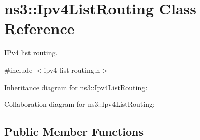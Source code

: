 \hypertarget{classns3_1_1Ipv4ListRouting}{}\section{ns3\+:\+:Ipv4\+List\+Routing Class Reference}
\label{classns3_1_1Ipv4ListRouting}


I\+Pv4 list routing.  




{\ttfamily \#include $<$ipv4-\/list-\/routing.\+h$>$}



Inheritance diagram for ns3\+:\+:Ipv4\+List\+Routing\+:


Collaboration diagram for ns3\+:\+:Ipv4\+List\+Routing\+:
\subsection*{Public Member Functions}

